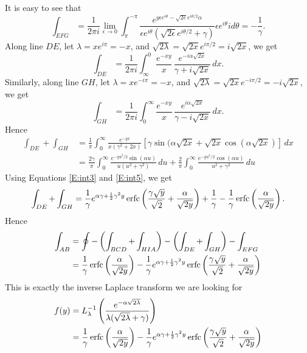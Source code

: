 It is easy to see that
\[
  \int_{EFG} = \frac{1}{2\pi i} \lim_{\epsilon \to 0} 
    \int_{\pi}^{-\pi} 
    \frac{ e^{ y \epsilon e^{i\theta} - \sqrt{2\epsilon} e^{i\theta/2} \alpha } }
         { \epsilon e^{i\theta} (\sqrt{2\epsilon} e^{i\theta/2} + \gamma) }
    \epsilon e^{i\theta} i d\theta
   = - \frac{1}{\gamma}.
\]
Along line $DE$, let $\lambda=x e^{i\pi}=-x$, 
and $\sqrt{2\lambda}=\sqrt{2x} e^{i\pi /2}=i \sqrt{2x}$, we get
\[
  \int_{DE} = \frac{1}{2\pi i} 
    \int_{\infty}^0 \frac{e^{-xy}}{x}\, 
      \frac{e^{-i\alpha\sqrt{2x}}}{\gamma+i\sqrt{2x}}\, dx.
\]
Similarly, along line $GH$, let $\lambda=x e^{-i\pi}=-x$, 
and $\sqrt{2\lambda}=\sqrt{2x} e^{-i\pi /2}=-i \sqrt{2x}$, we get
\[
  \int_{GH} = \frac{1}{2\pi i} 
    \int^{\infty}_0 \frac{e^{-xy}}{x}\, 
      \frac{e^{i\alpha\sqrt{2x}}}{\gamma-i\sqrt{2x}}\, dx.
\]
Hence
\begin{align*}
  \int_{DE} + \int_{GH} 
  &= \frac{1}{\pi} \int_0^{\infty} \frac{e^{-yx}}{x(\gamma^2+2x)}
       \left[
         \gamma \sin(\alpha \sqrt{2x} + \sqrt{2x} \cos(\alpha \sqrt{2x})
       \right] \, dx  \\
  &= \frac{2\gamma}{\pi} \int_0^{\infty} 
       \frac{e^{-yu^2/2} \sin(\alpha u)}{u(u^2+\gamma^2)} \, du
     + \frac{2}{\pi} \int_0^{\infty} 
       \frac{e^{-yu^2/2} \cos(\alpha u)}{u^2+\gamma^2} \, du
\end{align*}
Using Equations \ref{E:int3} and \ref{E:int5}, we get
\[
  \int_{DE} + \int_{GH} 
  = \frac{1}{\gamma} e^{\alpha \gamma+\frac{1}{2}\gamma^2 y} 
      \operatorname*{erfc} \left( \frac{\gamma \sqrt{y}}{\sqrt{2}}+ \frac{\alpha}{\sqrt{2y}} \right)
    + \frac{1}{\gamma} - \frac{1}{\gamma} \operatorname*{erfc} \left( \frac{\alpha}{\sqrt{2y}}
\right).
\]
Hence 
\begin{align*}
  \int_{AB} &= \oint - \left( \int_{BCD} + \int_{HIA} \right)
               - \left( \int_{DE} + \int_{GH} \right) - \int_{EFG}  \\
            &= \frac{1}{\gamma} \operatorname*{erfc} \left( \frac{\alpha}{\sqrt{2y}} \right)
               - \frac{1}{\gamma} e^{\alpha \gamma+\frac{1}{2}\gamma^2 y} 
                 \operatorname*{erfc} 
                   \left( 
                     \frac{\gamma \sqrt{y}}{\sqrt{2}} + \frac{\alpha}{\sqrt{2y}} 
                   \right)
\end{align*}
This is exactly the inverse Laplace transform we are looking for
\begin{align} \label{E:ilt1}
  f(y) &= L_{\lambda}^{-1} 
          \left( 
            \frac{e^{-\alpha \sqrt{2\lambda}}}{\lambda(\sqrt{2\lambda}+\gamma)} 
          \right)   \notag \\  
       &= \frac{1}{\gamma} \operatorname*{erfc} \left( \frac{\alpha}{\sqrt{2y}} \right)
          - \frac{1}{\gamma} e^{\alpha \gamma+\frac{1}{2}\gamma^2 y} 
            \operatorname*{erfc} 
              \left( 
                \frac{\gamma \sqrt{y}}{\sqrt{2}}+ \frac{\alpha}{\sqrt{2y}} 
              \right)
\end{align}


